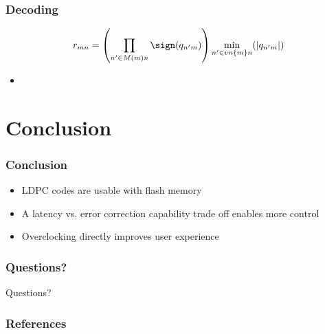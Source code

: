 \documentclass[	%
				]{beamer}
\begin{document}
\begin{frame}[fragile]
	\frametitle{Decoding}
	\begin{equation}
		r_{mn} = \left( \prod_{n' \in M(m)\\n}\sign(q_{n'm}) \right) \min_{n' \in vn\{m\}\\n}(\left|q_{n'm}\right|)
	\end{equation}
	\begin{itemize}
		\item 
	\end{itemize}
\end{frame}

\section{Conclusion}
\begin{frame}
	\frametitle{Conclusion}
	\begin{itemize}
		\item LDPC codes are usable with flash memory
		\item A latency vs. error correction capability trade off enables more control
		\item Overclocking directly improves user experience
	\end{itemize}
\end{frame}

\begin{frame}
	\frametitle{Questions?}
	\centering
	\Huge
	Questions?
\end{frame}

\begin{frame}[allowframebreaks]
	\frametitle{References}
	\linespread{1}
	\printbibliography
\end{frame}
\end{document}
